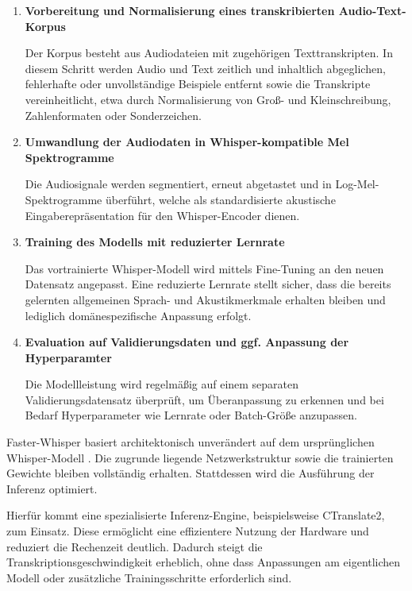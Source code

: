 \begin{enumerate}
    \item \textbf{Vorbereitung und Normalisierung eines transkribierten Audio-Text- Korpus} 

    Der Korpus besteht aus Audiodateien mit zugehörigen Texttranskripten. In diesem Schritt werden Audio und Text zeitlich und inhaltlich abgeglichen, fehlerhafte oder unvollständige Beispiele entfernt sowie die Transkripte vereinheitlicht, etwa durch Normalisierung von Groß- und Kleinschreibung, Zahlenformaten oder Sonderzeichen.
    
    \item \textbf{Umwandlung der Audiodaten in Whisper-kompatible Mel Spektrogramme}

    Die Audiosignale werden segmentiert, erneut abgetastet und in Log-Mel- Spektrogramme überführt, welche als standardisierte akustische Eingaberepräsentation für den Whisper-Encoder dienen.

    \item \textbf{Training des Modells mit reduzierter Lernrate} 
    
    Das vortrainierte Whisper-Modell wird mittels Fine-Tuning an den neuen Datensatz angepasst. Eine reduzierte Lernrate stellt sicher, dass die bereits gelernten allgemeinen Sprach- und Akustikmerkmale erhalten bleiben und lediglich domänespezifische Anpassung erfolgt.
    
    \item \textbf{Evaluation auf Validierungsdaten und ggf. Anpassung der Hyperparamter}
    
    Die Modellleistung wird regelmäßig auf einem separaten Validierungsdatensatz überprüft, um Überanpassung zu erkennen und bei Bedarf Hyperparameter wie Lernrate oder Batch-Größe anzupassen.
\end{enumerate}

Faster-Whisper basiert architektonisch unverändert auf dem ursprünglichen Whisper-Modell \cite{fasterwhisper}. Die zugrunde liegende Netzwerkstruktur sowie die trainierten Gewichte bleiben vollständig erhalten. Stattdessen wird die Ausführung der Inferenz optimiert.

Hierfür kommt eine spezialisierte Inferenz-Engine, beispielsweise CTranslate2, zum Einsatz. Diese ermöglicht eine effizientere Nutzung der Hardware und reduziert die Rechenzeit deutlich. Dadurch steigt die Transkriptionsgeschwindigkeit erheblich, ohne dass Anpassungen am eigentlichen Modell oder zusätzliche Trainingsschritte erforderlich sind.

